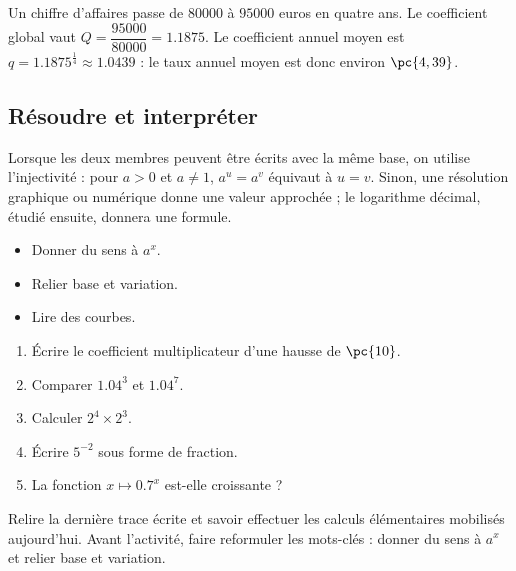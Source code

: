 \begin{example}
Un chiffre d'affaires passe de $\num{80000}$ à $\num{95000}$ euros en quatre ans. Le coefficient global vaut $Q=\dfrac{\num{95000}}{\num{80000}}=\num{1,1875}$. Le coefficient annuel moyen est $q=\num{1,1875}^{\frac14}\approx\num{1,0439}$ : le taux annuel moyen est donc environ $\pc{4,39}$.
\end{example}

\subsection{Résoudre et interpréter}
Lorsque les deux membres peuvent être écrits avec la même base, on utilise l'injectivité : pour $a>0$ et $a\neq1$, $a^u=a^v$ équivaut à $u=v$. Sinon, une résolution graphique ou numérique donne une valeur approchée ; le logarithme décimal, étudié ensuite, donnera une formule.

\begin{objectives}\begin{itemize}\item Donner du sens à $a^x$.\item Relier base et variation.\item Lire des courbes.\end{itemize}\end{objectives}
\begin{fluency}\begin{enumerate}\item Écrire le coefficient multiplicateur d'une hausse de $\pc{10}$. \item Comparer $\num{1,04}^3$ et $\num{1,04}^7$. \item Calculer $2^4\times2^3$. \item Écrire $5^{-2}$ sous forme de fraction. \item La fonction $x\mapsto\num{0,7}^x$ est-elle croissante ? \end{enumerate}\end{fluency}
\begin{prerequisites}Relire la dernière trace écrite et savoir effectuer les calculs élémentaires mobilisés aujourd'hui. Avant l'activité, faire reformuler les mots-clés : donner du sens à $a^x$ et relier base et variation.\end{prerequisites}


